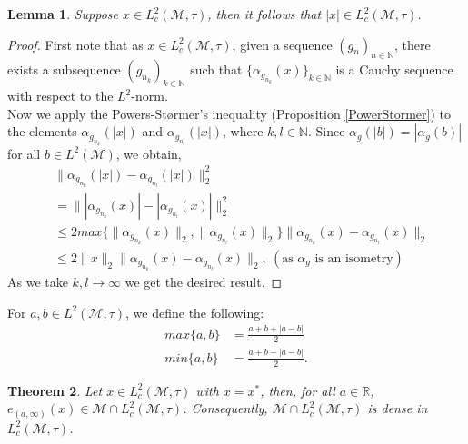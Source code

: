 \documentclass[11pt]{amsart}
\newtheorem{thm}{Theorem}[section]
\newtheorem{lem}[thm]{Lemma}
\theoremstyle{definition}
\theoremstyle{myremark}
\numberwithin{equation}{section}
\newcommand{\CM}{\mathcal{M}}
\begin{document}
\begin{lem}\label{modcpt}
Suppose $x\in L_{c}^{2}(\mathcal{M},\tau)$, then it follows that $  |x| \in L_{c}^{2}(\mathcal{M},\tau)$. 
\end{lem}
\begin{proof}
First note that as  $x \in L_{c}^{2}(\CM,\tau)$, given a sequence $(g_{n})_{n\in \mathbb{N}}$, there exists a subsequence $(g_{n_{k}})_{k\in \mathbb{N}}$ such that $\{\alpha_{g_{n_{k}}}(x)\}_{k\in \mathbb{N}}$  is a Cauchy sequence with respect to the $L^{2}$-norm.\\
Now we apply the  Powers-St\o rmer's inequality (Proposition \ref{PowerStormer}) to the elements  $\alpha_{g_{n_{k}}}(|x|)$ and $\alpha_{g_{n_{l}}}(|x|)$, where $k,l\in \mathbb{N}$. Since $\alpha_{g}(|b|)=|\alpha_{g}(b)|$ for all $b \in L^{2}(\CM)$, we obtain,
\begin{align*}
&\|\alpha_{g_{n_{k}}}(|x|)-\alpha_{g_{n_{l}}}(|x|)\|^{2}_{2}\\&=\||\alpha_{g_{n_{k}}}(x)|-|\alpha_{g_{n_{l}}}(x)|\|^{2}_{2}\\&\leq 2max\{\|\alpha_{g_{n_{k}}}(x)\|_{2},\|\alpha_{g_{n_{l}}}(x)\|_{2}\}\|\alpha_{g_{n_{k}}}(x)-\alpha_{g_{n_{l}}}(x)\|_{2}\\
&\leq 2\|x\|_{2}\|\alpha_{g_{n_{k}}}(x)-\alpha_{g_{n_{l}}}(x)\|_{2}, ~(\text{as } \alpha_g \text{ is an isometry})
\end{align*}
As we take $k,l \rightarrow \infty$ we get the desired result.
\end{proof}
\noindent For $a,b \in L^{2}(\CM,\tau)$,  we define the following: 
\begin{align*}
    max\{a,b\}&=\frac{a+b+|a-b|}{2}\\
    min\{a,b\}&=\frac{a+b-|a-b|}{2}.
\end{align*}
\begin{thm}\label{Density_of_M_c}
Let $x \in L^{2}_{c}(\CM,\tau)$ with $ x = x^*$, then, for all $a\in \mathbb{R}$, $e_{(a,\infty)}(x)\in \CM\cap L^{2}_{c}(\CM,\tau)$. Consequently, $\CM \cap L^{2}_{c}(\CM,\tau)$ is dense in $L_{c}^{2}(\CM,\tau)$. 
\end{thm}
\end{document}
